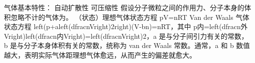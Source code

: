 \markdownRendererDocumentBegin
\markdownRendererSectionBegin
{}\markdownRendererInterblockSeparator
{}\markdownRendererSectionBegin
{}\markdownRendererInterblockSeparator
{}气体基本特性：\markdownRendererInterblockSeparator
{}\markdownRendererOlBeginTight
{}自动扩散性\markdownRendererOlItemEnd 
{}可压缩性\markdownRendererOlItemEnd 
\markdownRendererOlEndTight \markdownRendererInterblockSeparator
{}\markdownRendererSectionBegin
{}\markdownRendererInterblockSeparator
{}\markdownRendererSectionBegin
{}\markdownRendererInterblockSeparator
{}假设分子微粒之间的作用力、分子本身的体积忽略不计的气体为。\markdownRendererParagraphSeparator
{}（状态）理想气体状态方程 \markdownRendererDollarSign{}pV=nRT\markdownRendererDollarSign{}\markdownRendererInterblockSeparator
{}
\markdownRendererSectionEnd \markdownRendererSectionBegin
{}\markdownRendererInterblockSeparator
{}Van der Waals 气体状态方程 \markdownRendererDollarSign{}\markdownRendererBackslash{}left(p+a\markdownRendererBackslash{}left(\markdownRendererLeftBrace{}\markdownRendererBackslash{}dfrac\markdownRendererLeftBrace{}n\markdownRendererRightBrace{}\markdownRendererLeftBrace{}V\markdownRendererRightBrace{}\markdownRendererRightBrace{}\markdownRendererBackslash{}right)\markdownRendererCircumflex{}2\markdownRendererBackslash{}right)(V-bn)=nRT\markdownRendererDollarSign{}，其中 \markdownRendererDollarSign{}p\markdownRendererUnderscore{}内=\markdownRendererBackslash{}left(\markdownRendererBackslash{}dfrac\markdownRendererLeftBrace{}n\markdownRendererUnderscore{}外\markdownRendererRightBrace{}\markdownRendererLeftBrace{}V\markdownRendererRightBrace{}\markdownRendererBackslash{}right)\markdownRendererBackslash{}left(\markdownRendererBackslash{}dfrac\markdownRendererLeftBrace{}n\markdownRendererUnderscore{}内\markdownRendererRightBrace{}\markdownRendererLeftBrace{}V\markdownRendererRightBrace{}\markdownRendererBackslash{}right)=\markdownRendererBackslash{}left(\markdownRendererBackslash{}dfrac\markdownRendererLeftBrace{}n\markdownRendererRightBrace{}\markdownRendererLeftBrace{}V\markdownRendererRightBrace{}\markdownRendererBackslash{}right)\markdownRendererCircumflex{}2\markdownRendererDollarSign{}，\markdownRendererDollarSign{}a\markdownRendererDollarSign{} 是与分子间引力有关的常数，\markdownRendererDollarSign{}b\markdownRendererDollarSign{} 是与分子本身体积有关的常数，统称为 van der Waals 常数。通常，\markdownRendererDollarSign{}a\markdownRendererDollarSign{} 和 \markdownRendererDollarSign{}b\markdownRendererDollarSign{} 数值越大，表明实际气体距理想气体愈远，从而产生的偏差就愈大。\markdownRendererInterblockSeparator

